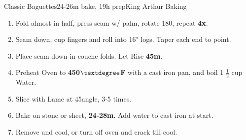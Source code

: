 \documentclass[]{mikescards}
\begin{document}
\begin{recipe}{Classic Baguettes}{24-26m bake, 19h prep}{King Arthur Baking}
\begin{parcolumns}[colwidths={1=100pt}, rulebetween]{2}
{\begin{enumerate}
      \item \hspace{10pt}Fold almost in half, press seam w/ palm, rotate 180\textdegree, repeat \textbf{4x}. 
      \item Seam down, cup fingers and roll into 16" logs. Taper each end to point.
      \item Place seam down in couche folds. Let Rise \textbf{45m}.
      \item Preheat Oven to \textbf{450$\textdegree$F} with a cast iron pan, and boil 1 $\frac{1}{2}$ cup Water.
      \item Slice with Lame at 45\textdegree angle, 3-5 times.
      \item Bake on stone or sheet, \textbf{24-28m}. Add water to cast iron at start. 
      \item Remove and cool, or turn off oven and crack till cool.
    \end{enumerate}
  }
\end{parcolumns}



\end{recipe}
\end{document}
